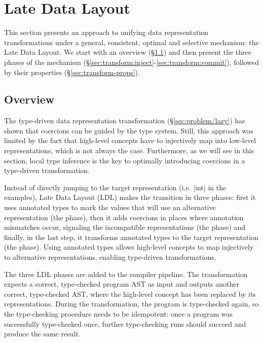 \section{Late Data Layout}
\label{sec:transform}

This section presents an approach to unifying data representation transformations under a general, consistent, optimal and selective mechanism: the Late Data Layout. We start with an overview (\S\ref{sec:transform:how}) and then present the three phases of the mechanism (\S\ref{sec:transform:inject}-\ref{sec:transform:commit}), followed by their properties (\S\ref{sec:transform-props}).

\subsection{Overview}
\label{sec:transform:how}

The type-driven data representation transformation (\S\ref{sec:problem/lazy}) has shown that coercions can be guided by the type system. Still, this approach was limited by the fact that high-level concepts have to injectively map into low-level representations, which is not always the case. Furthermore, as we will see in this section, local type inference \cite{odersky-colored-local-type-inf} is the key to optimally introducing coercions in a type-driven transformation.

Instead of directly jumping to the target representation (i.e. |int| in the examples), Late Data Layout (LDL) makes the transition in three phases: first it uses annotated types to mark the values that will use an alternative representation (the \inject{} phase), then it adds coercions in places where annotation mismatches occur, signaling the incompatible representations (the \coerce{} phase) and finally, in the last step, it transforms annotated types to the target representation (the \commit{} phase). Using annotated types allows high-level concepts to map injectively to alternative representations, enabling type-driven transformations.

The three LDL phases are added to the compiler pipeline. The transformation expects a correct, type-checked program AST as input and outputs another correct, type-checked AST, where the high-level concept has been replaced by its representations. During the transformation, the program is type-checked again, so the type-checking procedure needs to be idempotent: once a program was successfully type-checked once, further type-checking runs should succeed and produce the same result.


